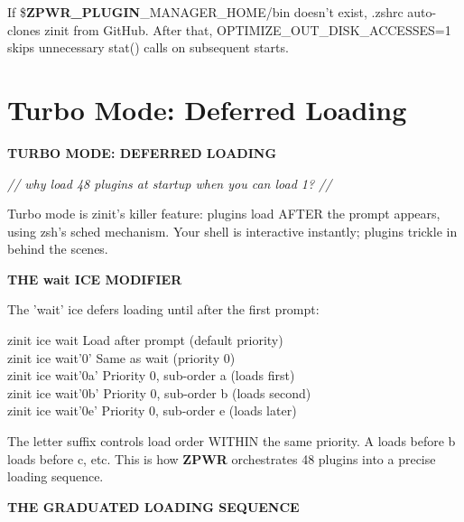 \documentclass[11pt,a4paper,twoside]{book}
\begin{document}
If \$\textbf{ZPWR\_PLUGIN}\_MANAGER\_HOME/bin doesn't exist, .zshrc auto-clones zinit from GitHub. After that, OPTIMIZE\_OUT\_DISK\_ACCESSES=1 skips unnecessary stat() calls on subsequent starts.


\vspace{16pt}

\section{Turbo Mode: Deferred Loading}


\vspace{10pt}
{\large\bfseries\color{neoncyan} TURBO MODE: DEFERRED LOADING}\vspace{6pt}

{\small\itshape\color{dimtext} // why load 48 plugins at startup when you can load 1? //}

Turbo mode is zinit's killer feature: plugins load AFTER the prompt appears, using zsh's sched mechanism. Your shell is interactive instantly; plugins trickle in behind the scenes.


\vspace{12pt}
{\bfseries\color{neonyellow} THE wait ICE MODIFIER}\vspace{4pt}

The 'wait' ice defers loading until after the first prompt:

\begin{codebox}
\color{neongreen}zinit ice wait            Load after prompt (default priority)\\
\color{neongreen}zinit ice wait'0'         Same as wait (priority 0)\\
\color{neongreen}zinit ice wait'0a'        Priority 0, sub-order a (loads first)\\
\color{neongreen}zinit ice wait'0b'        Priority 0, sub-order b (loads second)\\
\color{neongreen}zinit ice wait'0e'        Priority 0, sub-order e (loads later)\\
\end{codebox}

The letter suffix controls load order WITHIN the same priority. A loads before b loads before c, etc. This is how \textbf{ZPWR} orchestrates 48 plugins into a precise loading sequence.


\vspace{12pt}
{\bfseries\color{neonyellow} THE GRADUATED LOADING SEQUENCE}\vspace{4pt}
\end{document}
